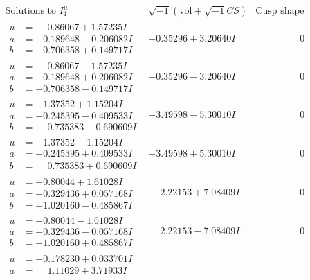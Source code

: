 \documentclass[1p]{elsarticle_modified}
\theoremstyle{definition}
\newcommand{\I}{\sqrt{-1}}
\begin{document}
$$\begin{array}{c|c|c}
\text{Solutions to }I^u_{1}& \I (\text{vol} + \sqrt{-1}CS) & \text{Cusp shape}\\
 \hline 
\begin{aligned}
u &= \phantom{-}0.86067 + 1.57235 I \\
a &= -0.189648 - 0.206082 I \\
b &= -0.706358 + 0.149717 I\end{aligned}
 & -0.35296 + 3.20640 I & \phantom{-0.000000 } 0 \\ \hline\begin{aligned}
u &= \phantom{-}0.86067 - 1.57235 I \\
a &= -0.189648 + 0.206082 I \\
b &= -0.706358 - 0.149717 I\end{aligned}
 & -0.35296 - 3.20640 I & \phantom{-0.000000 } 0 \\ \hline\begin{aligned}
u &= -1.37352 + 1.15204 I \\
a &= -0.245395 - 0.409533 I \\
b &= \phantom{-}0.735383 - 0.690609 I\end{aligned}
 & -3.49598 - 5.30010 I & \phantom{-0.000000 } 0 \\ \hline\begin{aligned}
u &= -1.37352 - 1.15204 I \\
a &= -0.245395 + 0.409533 I \\
b &= \phantom{-}0.735383 + 0.690609 I\end{aligned}
 & -3.49598 + 5.30010 I & \phantom{-0.000000 } 0 \\ \hline\begin{aligned}
u &= -0.80044 + 1.61028 I \\
a &= -0.329436 + 0.057168 I \\
b &= -1.020160 - 0.485867 I\end{aligned}
 & \phantom{-}2.22153 + 7.08409 I & \phantom{-0.000000 } 0 \\ \hline\begin{aligned}
u &= -0.80044 - 1.61028 I \\
a &= -0.329436 - 0.057168 I \\
b &= -1.020160 + 0.485867 I\end{aligned}
 & \phantom{-}2.22153 - 7.08409 I & \phantom{-0.000000 } 0 \\ \hline\begin{aligned}
u &= -0.178230 + 0.033701 I \\
a &= \phantom{-}1.11029 + 3.71933 I \\

\end{aligned}
\end{array}$$
\end{document}
